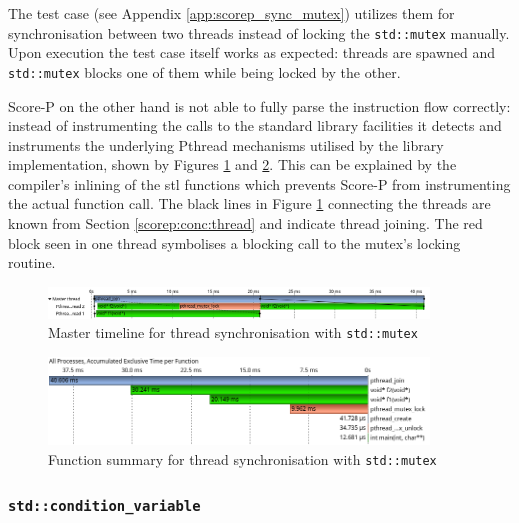 The test case (see Appendix \ref{app:scorep_sync_mutex}) utilizes them for synchronisation between two threads instead of locking the \texttt{std::mutex} manually. Upon execution the test case itself works as expected: threads are spawned and \texttt{std::mutex} blocks one of them while being locked by the other.

Score-P on the other hand is not able to fully parse the instruction flow correctly: instead of instrumenting the calls to the standard library facilities it detects and instruments the underlying Pthread mechanisms utilised by the library implementation, shown by Figures \ref{scorep:sync_pthread_mutex_timeline} and \ref{scorep:sync_pthread_mutex_summary}. This can be explained by the compiler's inlining of the \gls{stl} functions which prevents Score-P from instrumenting the actual function call. The black lines in Figure \ref{scorep:sync_pthread_mutex_timeline} connecting the threads are known from Section \ref{scorep:conc:thread} and indicate thread joining. The red block seen in one thread symbolises a blocking call to the mutex's locking routine.

\begin{figure}[htbp]
	\begin{center}
		\includegraphics[width=0.9\textwidth]{img/scorep_pthread_mutex_timeline.png}
		\caption{Master timeline for thread synchronisation with \texttt{std::mutex}}
		\label{scorep:sync_pthread_mutex_timeline}
	\end{center}
\end{figure}

\begin{figure}[htbp]
	\begin{center}
		\includegraphics[width=0.9\textwidth]{img/scorep_pthread_mutex_summary.png}
		\caption{Function summary for thread synchronisation with \texttt{std::mutex}}
		\label{scorep:sync_pthread_mutex_summary}
	\end{center}
\end{figure}

\subsubsection{\texttt{std::condition\_variable}}\label{scorep:sync:cv}


